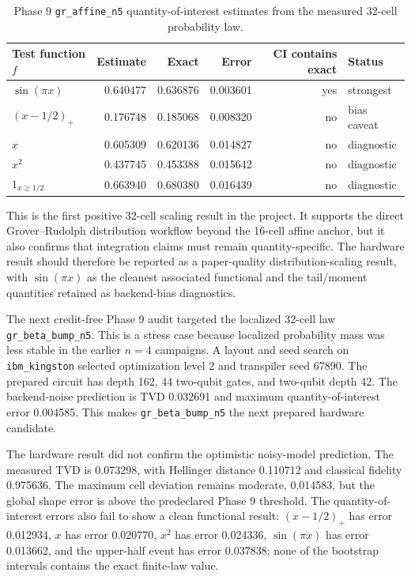 \begin{table}[h]
\centering
\begin{tabular}{lrrrrl}
\toprule
Test function \(f\) & Estimate & Exact & Error & CI contains exact & Status \\
\midrule
\(\sin(\pi x)\) & 0.640477 & 0.636876 & 0.003601 & yes & strongest \\
\((x-1/2)_+\) & 0.176748 & 0.185068 & 0.008320 & no & bias caveat \\
\(x\) & 0.605309 & 0.620136 & 0.014827 & no & diagnostic \\
\(x^2\) & 0.437745 & 0.453388 & 0.015642 & no & diagnostic \\
\(1_{x\ge1/2}\) & 0.663940 & 0.680380 & 0.016439 & no & diagnostic \\
\bottomrule
\end{tabular}
\caption{Phase 9 \texttt{gr\_affine\_n5} quantity-of-interest estimates from
the measured 32-cell probability law.}
\label{tab:phase9-affine-n5-qoi}
\end{table}

This is the first positive 32-cell scaling result in the project. It supports
the direct Grover--Rudolph distribution workflow beyond the 16-cell affine
anchor, but it also confirms that integration claims must remain
quantity-specific. The hardware result should therefore be reported as a
paper-quality distribution-scaling result, with \(\sin(\pi x)\) as the cleanest
associated functional and the tail/moment quantities retained as backend-bias
diagnostics.

The next credit-free Phase 9 audit targeted the localized 32-cell law
\texttt{gr\_beta\_bump\_n5}. This is a stress case because localized
probability mass was less stable in the earlier \(n=4\) campaigns. A layout and
seed search on \texttt{ibm\_kingston} selected optimization level 2 and
transpiler seed 67890. The prepared circuit has depth 162, 44 two-qubit gates,
and two-qubit depth 42. The backend-noise prediction is TVD 0.032691 and
maximum quantity-of-interest error 0.004585. This makes
\texttt{gr\_beta\_bump\_n5} the next prepared hardware candidate.

The hardware result did not confirm the optimistic noisy-model prediction. The
measured TVD is 0.073298, with Hellinger distance 0.110712 and classical
fidelity 0.975636. The maximum cell deviation remains moderate, 0.014583, but
the global shape error is above the predeclared Phase 9 threshold. The
quantity-of-interest errors also fail to show a clean functional result:
\((x-1/2)_+\) has error 0.012934, \(x\) has error 0.020770, \(x^2\) has error
0.024336, \(\sin(\pi x)\) has error 0.013662, and the upper-half event has
error 0.037838; none of the bootstrap intervals contains the exact finite-law
value.

